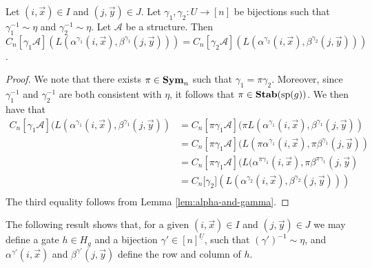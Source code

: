 \documentclass[../paper.tex]{subfiles}
\begin{document}
\begin{lem}
  \label{lem:alpha-ind-gamma}
  Let $(i,\vec{x}) \in I$ and $(j, \vec{y}) \in J$. Let $\gamma_1, \gamma_2: U
  \rightarrow [n]$ be bijections such that $\gamma^{-1}_1 \sim \eta$ and
  $\gamma^{-1}_2 \sim \eta$. Let $\mathcal{A}$ be a structure. Then
  $C_n[\gamma_1 \mathcal{A}] (L(\alpha^{\gamma_1}(i, \vec{x}),
  \beta^{\gamma_1}(j, \vec{y}))) = C_n[\gamma_2 \mathcal{A}]
  (L(\alpha^{\gamma_2}(i, \vec{x}), \beta^{\gamma_2}(j, \vec{y})))$.
\end{lem}
\begin{proof}
  We note that there exists $\pi \in \text{\textbf{Sym}}_n$ such that $\gamma_1 = \pi
  \gamma_2$. Moreover, since $\gamma^{-1}_1$ and $\gamma^{-1}_2$ are both
  consistent with $\eta$, it follows that $\pi \in \text{\textbf{Stab}} (\text{sp} (g))$. We then have
  that
  \begin{align*}
    C_n[\gamma_1 \mathcal{A}](L(\alpha^{\gamma_1}(i, \vec{x}), \beta^{\gamma_1}(j,
    \vec{y})) &= C_n[\pi \gamma_1 \mathcal{A}](\pi L(\alpha^{\gamma_1}(i, \vec{x}),
                \beta^{\gamma_1}(j, \vec{y})) \\
              &= C_n[\pi \gamma_1 \mathcal{A}](L(\pi
                \alpha^{\gamma_1}(i, \vec{x}), \pi \beta^{\gamma_1}(j, \vec{y}))\\
              &= C_n[\pi
                \gamma_1 \mathcal{A}](L(\alpha^{\pi \gamma_1}(i, \vec{x}), \pi \beta^{\pi
                \gamma_1}(j, \vec{y})\\
              &= C_n[\gamma_2 \mathcal] (L(\alpha^{\gamma_2}(i,
                \vec{x}), \beta^{\gamma_2}(j, \vec{y})))\\
  \end{align*}The third equality follows from Lemma \ref{lem:alpha-and-gamma}.
\end{proof}

The following result shows that, for a given $(i, \vec{x}) \in I$ and $(j,
\vec{y}) \in J$ we may define a gate $h \in H_g$ and a bijection $\gamma' \in
[n]^{\underline{U}}$, such that $(\gamma')^{-1} \sim \eta$, and
$\alpha^{\gamma'}(i, \vec{x})$ and $\beta^{\gamma'}(j, \vec{y})$ define the row
and column of $h$.
\end{document}
